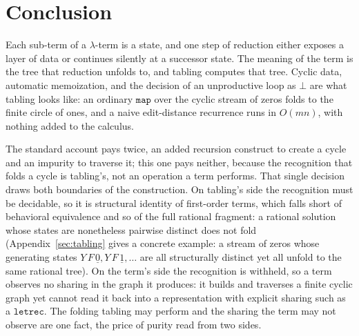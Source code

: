 
\section{Conclusion}\label{sec:conclusion}
Each sub-term of a $\lambda$-term is a state, and one step of reduction either exposes a layer of data or continues silently at a successor state. The meaning of the term is the tree that reduction unfolds to, and tabling computes that tree. Cyclic data, automatic memoization, and the decision of an unproductive loop as $\bot$ are what tabling looks like: an ordinary $\mathtt{map}$ over the cyclic stream of zeros folds to the finite circle of ones, and a naive edit-distance recurrence runs in $O(mn)$, with nothing added to the calculus.

The standard account pays twice, an added recursion construct to create a cycle and an impurity to traverse it; this one pays neither, because the recognition that folds a cycle is tabling's, not an operation a term performs. That single decision draws both boundaries of the construction. On tabling's side the recognition must be decidable, so it is structural identity of first-order terms, which falls short of behavioral equivalence and so of the full rational fragment: a rational solution whose states are nonetheless pairwise distinct does not fold (Appendix~\ref{sec:tabling} gives a concrete example: a stream of zeros whose generating states $Y\,F\,\underline{0}, Y\,F\,\underline{1}, \dots$ are all structurally distinct yet all unfold to the same rational tree). On the term's side the recognition is withheld, so a term observes no sharing in the graph it produces: it builds and traverses a finite cyclic graph yet cannot read it back into a representation with explicit sharing such as a $\mathtt{letrec}$. The folding tabling may perform and the sharing the term may not observe are one fact, the price of purity read from two sides.

